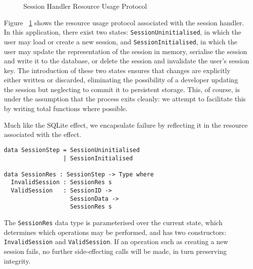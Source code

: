 \documentclass[preprint]{sigplanconf}
\begin{document}
\begin{figure}[htpb!]
\centering
{}
\caption{Session Handler Resource Usage Protocol}
\label{fig:sessionstates}
\end{figure}

Figure ~\ref{fig:sessionstates} shows the resource usage protocol associated with the session handler. In this application, there exist two states: \texttt{SessionUninitialised}, in which the user may load or create a new session, and \texttt{SessionInitialised}, in which the user may update the representation of the session in memory, serialise the session and write it to the database, or delete the session and invalidate the user's session key. The introduction of these two states ensures that changes are explicitly either written or discarded, eliminating the possibility of a developer updating the session but neglecting to commit it to persistent storage. This, of course, is under the assumption that the process exits cleanly: we attempt to facilitate this by writing total functions where possible.

Much like the SQLite effect, we encapsulate failure by reflecting it in the resource associated with the effect. 
{\small
\begin{verbatim}
data SessionStep = SessionUninitialised
                 | SessionInitialised

data SessionRes : SessionStep -> Type where
  InvalidSession : SessionRes s  
  ValidSession   : SessionID -> 
                   SessionData -> 
                   SessionRes s
\end{verbatim}
}
The \texttt{SessionRes} data type is parameterised over the current state, which determines which operations may be performed, and has two constructors: \texttt{InvalidSession} and \texttt{ValidSession}. If an operation such as creating a new session fails, no further side-effecting calls will be made, in turn preserving integrity. 
\end{document}
